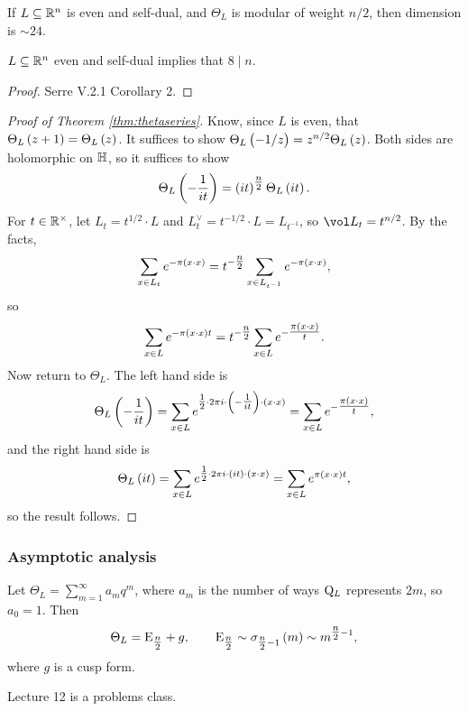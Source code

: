 If $ L \subseteq \mathbb{R}^n $ is even and self-dual, and $ \Theta_L $ is modular of weight $ n / 2 $, then dimension is $ \sim 24 $.

\begin{fact*}
$ L \subseteq \mathbb{R}^n $ even and self-dual implies that $ 8 \mid n $.
\end{fact*}

\begin{proof}
Serre V.2.1 Corollary 2.
\end{proof}

\pagebreak

\begin{proof}[Proof of Theorem \ref{thm:thetaseries}]
Know, since $ L $ is even, that $ \Theta_L\br{z + 1} = \Theta_L\br{z} $. It suffices to show $ \Theta_L\br{-1 / z} = z^{n / 2}\Theta_L\br{z} $. Both sides are holomorphic on $ \mathbb{H} $, so it suffices to show
$$ \Theta_L\br{-\dfrac{1}{it}} = \br{it}^{\tfrac{n}{2}}\Theta_L\br{it}. $$
For $ t \in \mathbb{R}^\times $, let $ L_t = t^{1 / 2} \cdot L $ and $ L_t^\vee = t^{-1 / 2} \cdot L = L_{t^{-1}} $, so $ \vol L_t = t^{n / 2} $. By the facts,
$$ \sum_{x \in L_t} e^{-\pi\br{x \cdot x}} = t^{-\tfrac{n}{2}}\sum_{x \in L_{t^{-1}}} e^{-\pi\br{x \cdot x}}, $$
so
$$ \sum_{x \in L} e^{-\pi\br{x \cdot x}t} = t^{-\tfrac{n}{2}}\sum_{x \in L} e^{-\tfrac{\pi\br{x \cdot x}}{t}}. $$
Now return to $ \Theta_L $. The left hand side is
$$ \Theta_L\br{-\dfrac{1}{it}} = \sum_{x \in L} e^{\tfrac{1}{2} \cdot 2\pi i \cdot \br{-\tfrac{1}{it}} \cdot \br{x \cdot x}} = \sum_{x \in L} e^{-\tfrac{\pi\br{x \cdot x}}{t}}, $$
and the right hand side is
$$ \Theta_L\br{it} = \sum_{x \in L} e^{\tfrac{1}{2} \cdot 2\pi i \cdot \br{it} \cdot \br{x \cdot x}} = \sum_{x \in L} e^{\pi\br{x \cdot x}t}, $$
so the result follows.
\end{proof}

\subsubsection{Asymptotic analysis}

Let $ \Theta_L = \sum_{m = 1}^\infty a_mq^m $, where $ a_m $ is the number of ways $ \mathrm{Q}_L $ represents $ 2m $, so $ a_0 = 1 $. Then
$$ \Theta_L = \E_{\tfrac{n}{2}} + g, \qquad \E_{\tfrac{n}{2}} \sim \sigma_{\tfrac{n}{2} - 1}\br{m} \sim m^{\tfrac{n}{2} - 1}, $$
where $ g $ is a cusp form.


Lecture 12 is a problems class.


